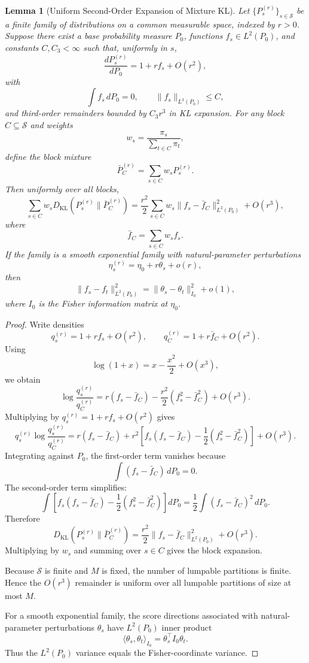 \documentclass[12pt]{article}
\newtheorem{lemma}[theorem]{Lemma}
\theoremstyle{definition}
\begin{document}
\begin{lemma}[Uniform Second-Order Expansion of Mixture KL]
\label{lem:fisher-uniform-expansion}
Let $\{P_s^{(r)}\}_{s\in\mathcal S}$ be a finite family of distributions on a
common measurable space, indexed by $r>0$.  Suppose there exist a base
probability measure $P_0$, functions $f_s\in L^2(P_0)$, and constants
$C,C_3<\infty$ such that, uniformly in $s$,
\[
\frac{dP_s^{(r)}}{dP_0}
=
1+r f_s+O(r^2),
\]
with
\[
\int f_s\,dP_0=0,
\qquad
\|f_s\|_{L^3(P_0)}\le C,
\]
and third-order remainders bounded by $C_3 r^3$ in KL expansion.  For any
block $C\subseteq\mathcal S$ and weights
\[
w_s=\frac{\pi_s}{\sum_{t\in C}\pi_t},
\]
define the block mixture
\[
\bar P_C^{(r)}
=
\sum_{s\in C}w_s P_s^{(r)}.
\]
Then uniformly over all blocks,
\[
\sum_{s\in C}w_s
D_{\mathrm{KL}}(P_s^{(r)}\|\bar P_C^{(r)})
=
\frac{r^2}{2}
\sum_{s\in C}
w_s
\|f_s-\bar f_C\|_{L^2(P_0)}^2
+
O(r^3),
\]
where
\[
\bar f_C=\sum_{s\in C}w_s f_s.
\]
If the family is a smooth exponential family with natural-parameter
perturbations
\[
\eta_s^{(r)}=\eta_0+r\theta_s+o(r),
\]
then
\[
\|f_s-f_t\|_{L^2(P_0)}^2
=
\|\theta_s-\theta_t\|_{I_0}^2
+
o(1),
\]
where $I_0$ is the Fisher information matrix at $\eta_0$.
\end{lemma}

\begin{proof}
Write densities
\[
q_s^{(r)}=1+r f_s+O(r^2),
\qquad
q_C^{(r)}=1+r\bar f_C+O(r^2).
\]
Using
\[
\log(1+x)=x-\frac{x^2}{2}+O(x^3),
\]
we obtain
\[
\log\frac{q_s^{(r)}}{q_C^{(r)}}
=
r(f_s-\bar f_C)
-
\frac{r^2}{2}(f_s^2-\bar f_C^2)
+
O(r^3).
\]
Multiplying by $q_s^{(r)}=1+r f_s+O(r^2)$ gives
\[
q_s^{(r)}
\log\frac{q_s^{(r)}}{q_C^{(r)}}
=
r(f_s-\bar f_C)
+
r^2
\left[
f_s(f_s-\bar f_C)
-
\frac12(f_s^2-\bar f_C^2)
\right]
+
O(r^3).
\]
Integrating against $P_0$, the first-order term vanishes because
\[
\int(f_s-\bar f_C)\,dP_0=0.
\]
The second-order term simplifies:
\[
\int
\left[
f_s(f_s-\bar f_C)
-
\frac12(f_s^2-\bar f_C^2)
\right]
dP_0
=
\frac12
\int
(f_s-\bar f_C)^2\,dP_0.
\]
Therefore
\[
D_{\mathrm{KL}}(P_s^{(r)}\|\bar P_C^{(r)})
=
\frac{r^2}{2}
\|f_s-\bar f_C\|_{L^2(P_0)}^2
+
O(r^3).
\]
Multiplying by $w_s$ and summing over $s\in C$ gives the block expansion.

Because $\mathcal S$ is finite and $M$ is fixed, the number of lumpable
partitions is finite.  Hence the $O(r^3)$ remainder is uniform over all
lumpable partitions of size at most $M$.

For a smooth exponential family, the score directions associated with
natural-parameter perturbations $\theta_s$ have $L^2(P_0)$ inner product
\[
\langle \theta_s,\theta_t\rangle_{I_0}
=
\theta_s^\top I_0\theta_t.
\]
Thus the $L^2(P_0)$ variance equals the Fisher-coordinate variance.
\end{proof}
\end{document}
